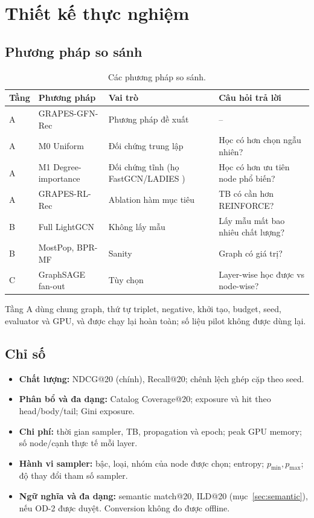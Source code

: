 \documentclass[11pt,a4paper,oneside]{report}
\begin{document}
\chapter{Thiết kế thực nghiệm}

\section{Phương pháp so sánh}
\begin{table}[h]
\centering\small
\caption{Các phương pháp so sánh.}\label{tab:comp}
\begin{tabularx}{\linewidth}{llYY}
\toprule
Tầng & Phương pháp & Vai trò & Câu hỏi trả lời \\
\midrule
A & GRAPES-GFN-Rec & Phương pháp đề xuất & -- \\
A & M0 Uniform & Đối chứng trung lập & Học có hơn chọn ngẫu nhiên? \\
A & M1 Degree-importance & Đối chứng tĩnh (họ FastGCN/LADIES \cite{fastgcn,ladies}) & Học có hơn ưu tiên node phổ biến? \\
A & GRAPES-RL-Rec & Ablation hàm mục tiêu & TB có cần hơn REINFORCE? \\
B & Full LightGCN & Không lấy mẫu & Lấy mẫu mất bao nhiêu chất lượng? \\
B & MostPop, BPR-MF & Sanity & Graph có giá trị? \\
C & GraphSAGE fan-out \cite{graphsage} & Tùy chọn & Layer-wise học được vs node-wise? \\
\bottomrule
\end{tabularx}
\end{table}
Tầng A dùng chung graph, thứ tự triplet, negative, khởi tạo, budget, seed, evaluator và GPU, và được chạy lại hoàn toàn; số liệu pilot không được dùng lại.

\section{Chỉ số}
\begin{itemize}
\item \textbf{Chất lượng:} NDCG@20 (chính), Recall@20; chênh lệch ghép cặp theo seed.
\item \textbf{Phân bổ và đa dạng:} Catalog Coverage@20; exposure và hit theo head/body/tail; Gini exposure.
\item \textbf{Chi phí:} thời gian sampler, TB, propagation và epoch; peak GPU memory; số node/cạnh thực tế mỗi layer.
\item \textbf{Hành vi sampler:} bậc, loại, nhóm của node được chọn; entropy; $p_{\min}, p_{\max}$; độ thay đổi tham số sampler.
\item \textbf{Ngữ nghĩa và đa dạng:} semantic match@20, ILD@20 (mục~\ref{sec:semantic}), nếu OD-2 được duyệt. Conversion không đo được offline.
\end{itemize}
\end{document}
